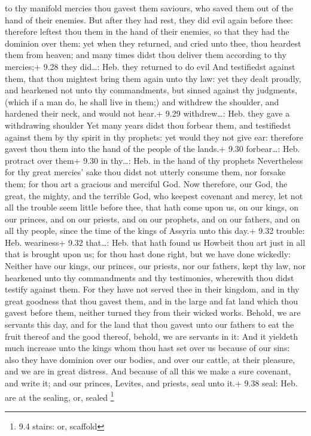 to thy manifold mercies thou gavest them saviours, who saved them out of
the hand of their enemies.  But after they had rest, they
did evil again before thee: therefore leftest thou them in the hand of
their enemies, so that they had the dominion over them: yet when they
returned, and cried unto thee, thou heardest them from heaven; and many
times didst thou deliver them according to thy mercies;+ 9.28 they
did\ldots: Heb. they returned to do evil  And testifiedst
against them, that thou mightest bring them again unto thy law: yet they
dealt proudly, and hearkened not unto thy commandments, but sinned
against thy judgments, (which if a man do, he shall live in them;) and
withdrew the shoulder, and hardened their neck, and would not hear.+
9.29 withdrew\ldots: Heb. they gave a withdrawing shoulder 
Yet many years didst thou forbear them, and testifiedst against them by
thy spirit in thy prophets: yet would they not give ear: therefore
gavest thou them into the hand of the people of the lands.+ 9.30
forbear\ldots: Heb. protract over them+ 9.30 in thy\ldots: Heb. in the
hand of thy prophets  Nevertheless for thy great mercies'
sake thou didst not utterly consume them, nor forsake them; for thou art
a gracious and merciful God.  Now therefore, our God, the
great, the mighty, and the terrible God, who keepest covenant and mercy,
let not all the trouble seem little before thee, that hath come upon us,
on our kings, on our princes, and on our priests, and on our prophets,
and on our fathers, and on all thy people, since the time of the kings
of Assyria unto this day.+ 9.32 trouble: Heb. weariness+ 9.32
that\ldots: Heb. that hath found us  Howbeit thou art just
in all that is brought upon us; for thou hast done right, but we have
done wickedly:  Neither have our kings, our princes, our
priests, nor our fathers, kept thy law, nor hearkened unto thy
commandments and thy testimonies, wherewith thou didst testify against
them.  For they have not served thee in their kingdom, and
in thy great goodness that thou gavest them, and in the large and fat
land which thou gavest before them, neither turned they from their
wicked works.  Behold, we are servants this day, and for
the land that thou gavest unto our fathers to eat the fruit thereof and
the good thereof, behold, we are servants in it:  And it
yieldeth much increase unto the kings whom thou hast set over us because
of our sins: also they have dominion over our bodies, and over our
cattle, at their pleasure, and we are in great distress. 
And because of all this we make a sure covenant, and write it; and our
princes, Levites, and priests, seal unto it.+ 9.38 seal: Heb. are at the
sealing, or, sealed \footnote{9.4 stairs: or, scaffold}

